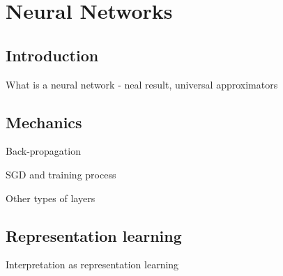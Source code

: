 
\section{Neural Networks}
\subsection{Introduction}
\begin{frame}{What is a neural network}
- neal result, universal approximators
\end{frame}
\subsection{Mechanics}
\begin{frame}{Back-propagation}

\end{frame}
\begin{frame}{SGD and training process}

\end{frame}
\begin{frame}{Other types of layers}

\end{frame}
\subsection{Representation learning}
\begin{frame}{Interpretation as representation learning}

\end{frame}
